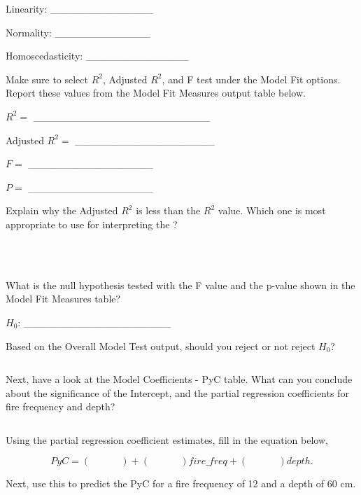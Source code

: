 \documentclass[
  openany]{krantz}
\begin{document}
Linearity: \_\_\_\_\_\_\_\_\_\_\_\_\_\_

Normality: \_\_\_\_\_\_\_\_\_\_\_\_\_

Homoscedasticity: \_\_\_\_\_\_\_\_\_\_\_\_\_\_

Make sure to select \(R^{2}\), Adjusted \(R^{2}\), and F test under the Model Fit options.
Report these values from the Model Fit Measures output table below.

\(R^{2} =\) \_\_\_\_\_\_\_\_\_\_\_\_\_\_\_\_\_\_\_\_\_\_\_\_

Adjusted \(R^{2} =\) \_\_\_\_\_\_\_\_\_\_\_\_\_\_\_\_\_\_\_

\(F =\) \_\_\_\_\_\_\_\_\_\_\_\_\_\_\_\_\_

\(P =\) \_\_\_\_\_\_\_\_\_\_\_\_\_\_\_\_\_

Explain why the Adjusted \(R^{2}\) is less than the \(R^{2}\) value.
Which one is most appropriate to use for interpreting the ?

\begin{verbatim}



\end{verbatim}

What is the null hypothesis tested with the F value and the p-value shown in the Model Fit Measures table?

\(H_{0}\): \_\_\_\_\_\_\_\_\_\_\_\_\_\_\_\_\_\_\_\_

Based on the Overall Model Test output, should you reject or not reject \(H_{0}\)?

\begin{verbatim}
\end{verbatim}

Next, have a look at the Model Coefficients - PyC table.
What can you conclude about the significance of the Intercept, and the partial regression coefficients for fire frequency and depth?

\begin{verbatim}

\end{verbatim}

Using the partial regression coefficient estimates, fill in the equation below,

\[PyC = (\:\:\:\:\:\:\:\:\:\:\:\:\:\:) + (\:\:\:\:\:\:\:\:\:\:\:\:\:\:)fire\_freq + (\:\:\:\:\:\:\:\:\:\:\:\:\:\:)depth.\]

Next, use this to predict the PyC for a fire frequency of 12 and a depth of 60 cm.
\end{document}
